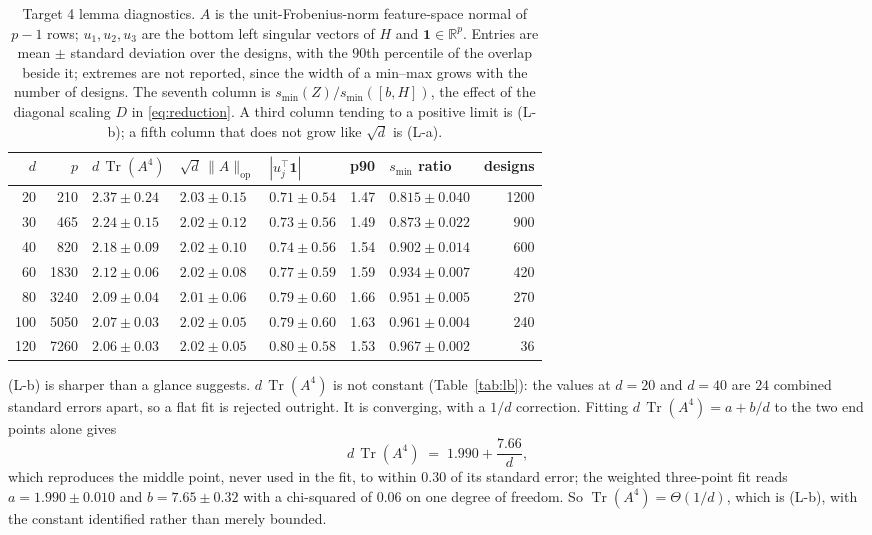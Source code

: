 \documentclass[11pt]{article}
\theoremstyle{definition}
\DeclareMathOperator{\Tr}{Tr}
\newcommand{\R}{\mathbb{R}}
\newcommand{\numLbChi}{0.06}
\newcommand{\numLbEndsSe}{24}
\newcommand{\numLbFitA}{1.990}
\newcommand{\numLbFitAse}{0.010}
\newcommand{\numLbFitB}{7.65}
\newcommand{\numLbFitBse}{0.32}
\newcommand{\numLbMidPull}{0.30}
\newcommand{\numLbTwoA}{1.990}
\newcommand{\numLbTwoB}{7.66}
\begin{document}
\begin{table}[t]
\centering\small
\caption{Target 4 lemma diagnostics. $A$ is the unit-Frobenius-norm feature-space normal of $p-1$
rows; $u_1,u_2,u_3$ are the bottom left singular vectors of $H$ and $\mathbf 1\in\R^p$. Entries are
mean $\pm$ standard deviation over the designs, with the $90$th percentile of the overlap beside it;
extremes are not reported, since the width of a min--max grows with the number of designs. The
seventh column is
$s_{\min}(Z)/s_{\min}([b,H])$, the effect of the diagonal scaling $D$ in \eqref{eq:reduction}. A
third column tending to a positive limit is (L-b); a fifth column that does not grow like $\sqrt d$
is (L-a).}
\label{tab:t4}
\begin{tabular}{rrlllrlr}
\toprule
$d$ & $p$ & $d\,\Tr(A^4)$ & $\sqrt d\,\|A\|_{\mathrm{op}}$ & $|u_j^\top\mathbf 1|$ & p90 &
$s_{\min}$ ratio & designs\\
\midrule
20 & 210 & $2.37\pm0.24$ & $2.03\pm0.15$ & $0.71\pm0.54$ & 1.47 & $0.815\pm0.040$ & 1200\\
30 & 465 & $2.24\pm0.15$ & $2.02\pm0.12$ & $0.73\pm0.56$ & 1.49 & $0.873\pm0.022$ & 900\\
40 & 820 & $2.18\pm0.09$ & $2.02\pm0.10$ & $0.74\pm0.56$ & 1.54 & $0.902\pm0.014$ & 600\\
60 & 1830 & $2.12\pm0.06$ & $2.02\pm0.08$ & $0.77\pm0.59$ & 1.59 & $0.934\pm0.007$ & 420\\
80 & 3240 & $2.09\pm0.04$ & $2.01\pm0.06$ & $0.79\pm0.60$ & 1.66 & $0.951\pm0.005$ & 270\\
100 & 5050 & $2.07\pm0.03$ & $2.02\pm0.05$ & $0.79\pm0.60$ & 1.63 & $0.961\pm0.004$ & 240\\
120 & 7260 & $2.06\pm0.03$ & $2.02\pm0.05$ & $0.80\pm0.58$ & 1.53 & $0.967\pm0.002$ & 36\\
\bottomrule
\end{tabular}
\end{table}

(L-b) is sharper than a glance suggests. $d\,\Tr(A^4)$ is not constant (Table~\ref{tab:lb}): the
values at $d=20$ and $d=40$ are $\numLbEndsSe$ combined standard errors apart, so a flat fit is
rejected outright. It is converging, with a $1/d$ correction. Fitting $d\,\Tr(A^4)=a+b/d$ to the two
end points alone gives
\[
d\,\Tr(A^4)\;=\;\numLbTwoA+\frac{\numLbTwoB}{d},
\]
which reproduces the middle point, never used in the fit, to within $\numLbMidPull$ of its standard
error; the weighted three-point fit reads $a=\numLbFitA\pm\numLbFitAse$ and
$b=\numLbFitB\pm\numLbFitBse$ with a chi-squared of $\numLbChi$ on one degree of freedom. So
$\Tr(A^4)=\Theta(1/d)$, which is (L-b), with the constant identified rather than merely bounded.
\end{document}
